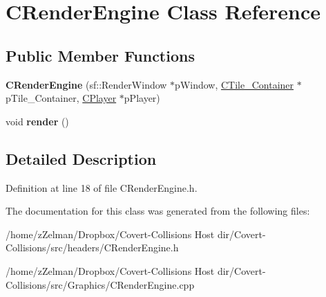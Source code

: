 \hypertarget{classCRenderEngine}{\section{C\-Render\-Engine Class Reference}
\label{classCRenderEngine}
}
\subsection*{Public Member Functions}
\begin{DoxyCompactItemize}
\item 
\hypertarget{classCRenderEngine_abb9a5a04b9c51e6ee44d0a51a6633d8d}{{\bfseries C\-Render\-Engine} (sf\-::\-Render\-Window $\ast$p\-Window, \hyperlink{classCTile__Container}{C\-Tile\-\_\-\-Container} $\ast$p\-Tile\-\_\-\-Container, \hyperlink{classCPlayer}{C\-Player} $\ast$p\-Player)}\label{classCRenderEngine_abb9a5a04b9c51e6ee44d0a51a6633d8d}

\item 
\hypertarget{classCRenderEngine_a38c058de2a8b54f208decdaa7b799ada}{void {\bfseries render} ()}\label{classCRenderEngine_a38c058de2a8b54f208decdaa7b799ada}

\end{DoxyCompactItemize}


\subsection{Detailed Description}


Definition at line 18 of file C\-Render\-Engine.\-h.



The documentation for this class was generated from the following files\-:\begin{DoxyCompactItemize}
\item 
/home/z\-Zelman/\-Dropbox/\-Covert-\/\-Collisions Host dir/\-Covert-\/\-Collisions/src/headers/C\-Render\-Engine.\-h\item 
/home/z\-Zelman/\-Dropbox/\-Covert-\/\-Collisions Host dir/\-Covert-\/\-Collisions/src/\-Graphics/C\-Render\-Engine.\-cpp\end{DoxyCompactItemize}
